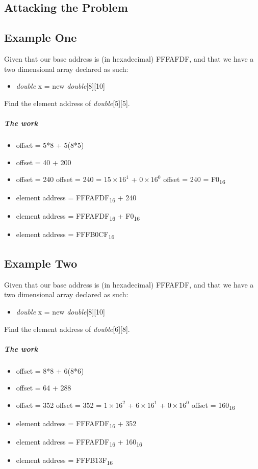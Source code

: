 \documentclass[12pt]{article}
\begin{document}
\begin{center}
\section{Attacking the Problem}
\end{center}
\subsection{Example One}
Given that our base address is (in hexadecimal) FFFAFDF, and that we have a two dimensional array declared as such:
\begin{itemize}[leftmargin=1.5em]
\item[] \textit{double} x = new \textit{double}[8][10]
\end{itemize}
Find the element address of \textit{double}[5][5].
\subparagraph{The work}
\begin{itemize}[leftmargin=1.5em]
\item[] offset = 5*8 + 5(8*5)
\item[] offset = 40 + 200
\item[] offset = 240
\subitem offset = 240 = $15\times16^1$ + $0\times16^0$
\subitem offset = 240 = F0\textsubscript{16}
\item[] element address = FFFAFDF\textsubscript{16} + 240
\item[] element address = FFFAFDF\textsubscript{16} + F0\textsubscript{16}
\item[] element address = FFFB0CF\textsubscript{16}
\end{itemize}

\subsection{Example Two}
Given that our base address is (in hexadecimal) FFFAFDF, and that we have a two dimensional array declared as such:
\begin{itemize}[leftmargin=1.5em]
\item[] \textit{double} x = new \textit{double}[8][10]
\end{itemize}
Find the element address of \textit{double}[6][8].
\subparagraph{The work}
\begin{itemize}[leftmargin=1.5em]
\item[] offset = 8*8 + 6(8*6)
\item[] offset = 64 + 288
\item[] offset = 352
\subitem offset = 352 = $1\times16^2$ + $6\times16^1$ + $0\times16^0$
\subitem offset = 160\textsubscript{16}
\item[] element address = FFFAFDF\textsubscript{16} + 352
\item[] element address = FFFAFDF\textsubscript{16} + 160\textsubscript{16}
\item[] element address = FFFB13F\textsubscript{16}
\end{itemize}
\end{document}
